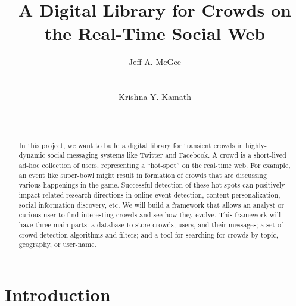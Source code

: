 \documentclass{sig-alternate}
\begin{document}
\title{A Digital Library for Crowds on the Real-Time Social Web}

\author{
\alignauthor Jeff A. McGee\\
       \\
       \\
\alignauthor Krishna Y. Kamath\\
      \\
       \\
}

\maketitle

\begin{abstract}
In this project, we want to build a digital library for transient crowds in highly-dynamic social messaging systems like Twitter and Facebook. A crowd is a short-lived ad-hoc collection of users, representing a ``hot-spot'' on the real-time web.  For example, an event like super-bowl might result in formation of crowds that are discussing various happenings in the game. Successful detection of these hot-spots can positively impact related research directions in online event detection, content personalization, social information discovery, etc. We will build a framework that allows an analyst or curious user to find interesting crowds and see how they evolve.  This framework will have three main parts: a database to store crowds, users, and their messages; a set of crowd detection algorithms and filters; and a tool for searching for crowds by topic, geography, or user-name.
\end{abstract}

\section{Introduction}
\end{document}
